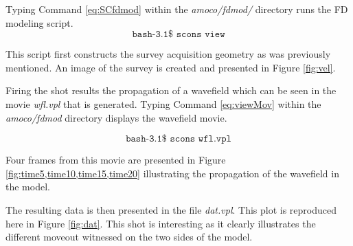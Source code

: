 {
\tiny

\normalsize
}

Typing Command \ref{eq:SCfdmod} within the \emph{amoco/fdmod/} directory runs the FD modeling script.
\begin{equation}\label{eq:SCfdmod} \texttt{bash-3.1\$\ scons\ view} \end{equation}

This script first constructs the survey acquisition geometry as was previously mentioned.  An image of the survey is created and presented
in Figure \ref{fig:vel}.


Firing the shot results the propagation of a wavefield which can be seen in the movie \emph{wfl.vpl} that is generated.  Typing 
Command \ref{eq:viewMov} within the \emph{amoco/fdmod} directory displays the wavefield movie.

\begin{equation}\label{eq:viewMov} \texttt{bash-3.1\$\ scons\ wfl.vpl} \end{equation}


Four frames from this movie are presented in Figure \ref{fig:time5,time10,time15,time20}  illustrating the 
propagation of the wavefield in the model.  



The resulting data is then presented in the file \emph{dat.vpl}.  This plot is reproduced here in Figure \ref{fig:dat}.  This shot is 
interesting as it clearly illustrates the different moveout witnessed on the two sides of the model.  

